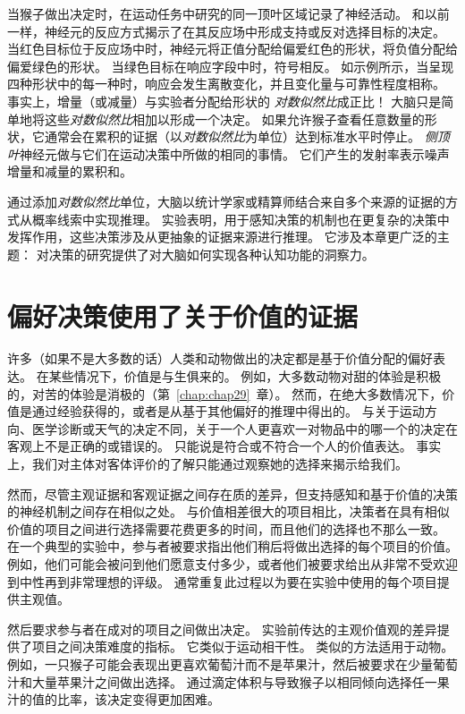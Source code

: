 当猴子做出决定时，在运动任务中研究的同一顶叶区域记录了神经活动。
和以前一样，神经元的反应方式揭示了在其反应场中形成支持或反对选择目标的决定。
当红色目标位于反应场中时，神经元将正值分配给偏爱红色的形状，将负值分配给偏爱绿色的形状。
当绿色目标在响应字段中时，符号相反。
如示例所示，当呈现四种形状中的每一种时，响应会发生离散变化，并且变化量与可靠性程度相称。
事实上，增量（或减量）与实验者分配给形状的 \textit{对数似然比}成正比！
大脑只是简单地将这些\textit{对数似然比}相加以形成一个决定。
如果允许猴子查看任意数量的形状，它通常会在累积的证据（以\textit{对数似然比}为单位）达到标准水平时停止。
\textit{侧顶叶}神经元做与它们在运动决策中所做的相同的事情。
它们产生的发射率表示噪声增量和减量的累积和。


通过添加\textit{对数似然比}单位，大脑以统计学家或精算师结合来自多个来源的证据的方式从概率线索中实现推理。
实验表明，用于感知决策的机制也在更复杂的决策中发挥作用，这些决策涉及从更抽象的证据来源进行推理。
它涉及本章更广泛的主题：
对决策的研究提供了对大脑如何实现各种认知功能的洞察力。



\section{偏好决策使用了关于价值的证据}

许多（如果不是大多数的话）人类和动物做出的决定都是基于价值分配的偏好表达。 
在某些情况下，价值是与生俱来的。
例如，大多数动物对甜的体验是积极的，对苦的体验是消极的（第~\ref{chap:chap29}~章）。
然而，在绝大多数情况下，价值是通过经验获得的，或者是从基于其他偏好的推理中得出的。
与关于运动方向、医学诊断或天气的决定不同，关于一个人更喜欢一对物品中的哪一个的决定在客观上不是正确的或错误的。
只能说是符合或不符合一个人的价值表达。
事实上，我们对主体对客体评价的了解只能通过观察她的选择来揭示给我们。


然而，尽管主观证据和客观证据之间存在质的差异，但支持感知和基于价值的决策的神经机制之间存在相似之处。
与价值相差很大的项目相比，决策者在具有相似价值的项目之间进行选择需要花费更多的时间，而且他们的选择也不那么一致。
在一个典型的实验中，参与者被要求指出他们稍后将做出选择的每个项目的价值。
例如，他们可能会被问到他们愿意支付多少，或者他们被要求给出从非常不受欢迎到中性再到非常理想的评级。
通常重复此过程以为要在实验中使用的每个项目提供主观值。


然后要求参与者在成对的项目之间做出决定。
实验前传达的主观价值观的差异提供了项目之间决策难度的指标。
它类似于运动相干性。
类似的方法适用于动物。
例如，一只猴子可能会表现出更喜欢葡萄汁而不是苹果汁，然后被要求在少量葡萄汁和大量苹果汁之间做出选择。
通过滴定体积与导致猴子以相同倾向选择任一果汁的值的比率，该决定变得更加困难。


